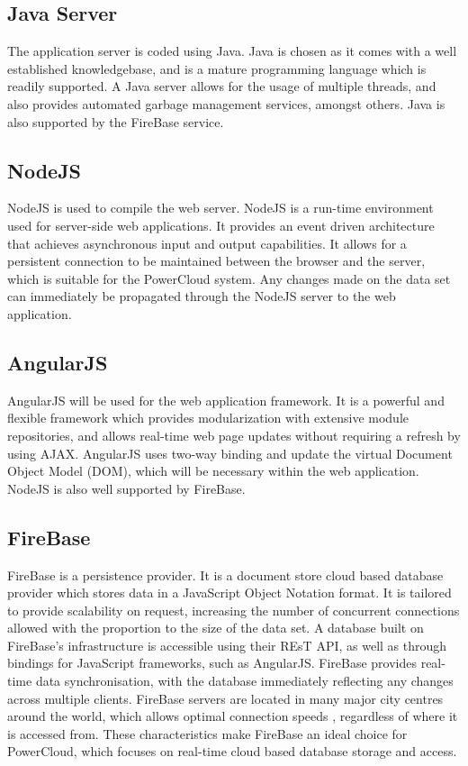 \documentclass{article}
\begin{document}
	\subsection{Java Server}
	
	The application server is coded using Java. Java is chosen as it 
	comes with a well established knowledgebase, and is a mature 
	programming language which is readily supported. A Java server allows 
	for the usage of multiple threads, and also provides automated 
	garbage management services, amongst others. Java is also supported 
	by the FireBase service.
	
	\subsection{NodeJS}
	
	NodeJS is used to compile the web server. NodeJS is a run-time 
	environment used for server-side web applications. It provides an 
	event driven architecture that achieves asynchronous input and output 
	capabilities. It allows for a  persistent connection to be maintained 
	between the browser and the server, which is suitable for the 
	PowerCloud system. Any changes made on the data set can immediately 
	be propagated through the NodeJS server to the web application.
	
	\subsection{AngularJS}
	
	AngularJS will be used for the web application framework. It is a 
	powerful and flexible framework which provides modularization with 
	extensive module repositories, and allows real-time web page updates 
	without requiring a refresh by using AJAX. AngularJS uses two-way 
	binding and update the virtual Document Object Model (DOM), which 
	will be necessary within the web application. NodeJS is also well 
	supported by FireBase.
	
	\subsection{FireBase}
	
	FireBase is a persistence provider. It is a document store cloud 
	based database provider which stores data in a JavaScript Object 
	Notation format. It is tailored to provide scalability on request, 
	increasing the number of concurrent connections allowed with the 
	proportion to the size of the data set. A database built on 
	FireBase's infrastructure is accessible using their REsT API, as well 
	as through bindings for JavaScript frameworks, such as AngularJS. 
	FireBase provides real-time data synchronisation, with the database 
	immediately reflecting any changes across multiple clients. FireBase 
	servers are located in many major city centres around the world, 
	which allows optimal connection speeds , regardless of where it is 
	accessed from. These characteristics make FireBase an ideal choice 
	for PowerCloud, which focuses on real-time cloud based database 
	storage and access.
	
\end{document}
